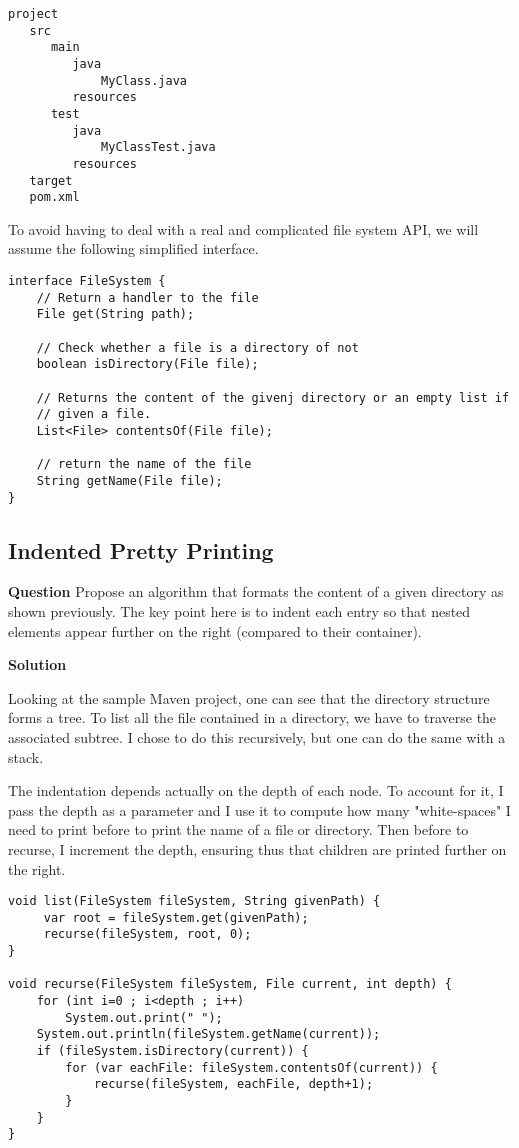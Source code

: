 \documentclass[11pt]{article}
\begin{document}
\begin{verbatim}
project
   src
      main
         java
             MyClass.java 
         resources
      test
         java
             MyClassTest.java
         resources
   target
   pom.xml
\end{verbatim}

To avoid having to deal with a real and complicated file system API, we will assume
the following simplified interface. 

\begin{verbatim}
interface FileSystem {
    // Return a handler to the file
    File get(String path);

    // Check whether a file is a directory of not
    boolean isDirectory(File file);

    // Returns the content of the givenj directory or an empty list if
    // given a file.
    List<File> contentsOf(File file);

    // return the name of the file
    String getName(File file);
}
\end{verbatim}

\subsection{Indented Pretty Printing}
\label{sec:org5a60622}

\textbf{Question} Propose an algorithm that formats the content of a
 given directory as shown previously. The key point here is to
 indent each entry so that nested elements appear further on the
 right (compared to their container).

\textbf{Solution}

Looking at the sample Maven project, one can see that the
directory structure forms a tree. To list all the file
contained in a directory, we have to traverse the associated
subtree. I chose to do this recursively, but one can do the same
with a stack.

The indentation depends actually on the depth of each node. To
account for it, I pass the depth as a parameter and I use it to
compute how many "white-spaces" I need to print before to print
the name of a file or directory. Then before to recurse, I
increment the depth, ensuring thus that children are printed
further on the right.

\begin{verbatim}
void list(FileSystem fileSystem, String givenPath) {
     var root = fileSystem.get(givenPath);
     recurse(fileSystem, root, 0);
}

void recurse(FileSystem fileSystem, File current, int depth) {
    for (int i=0 ; i<depth ; i++)
        System.out.print(" ");
    System.out.println(fileSystem.getName(current));
    if (fileSystem.isDirectory(current)) {
        for (var eachFile: fileSystem.contentsOf(current)) {
            recurse(fileSystem, eachFile, depth+1);
        }
    }
}
\end{verbatim}
\end{document}
